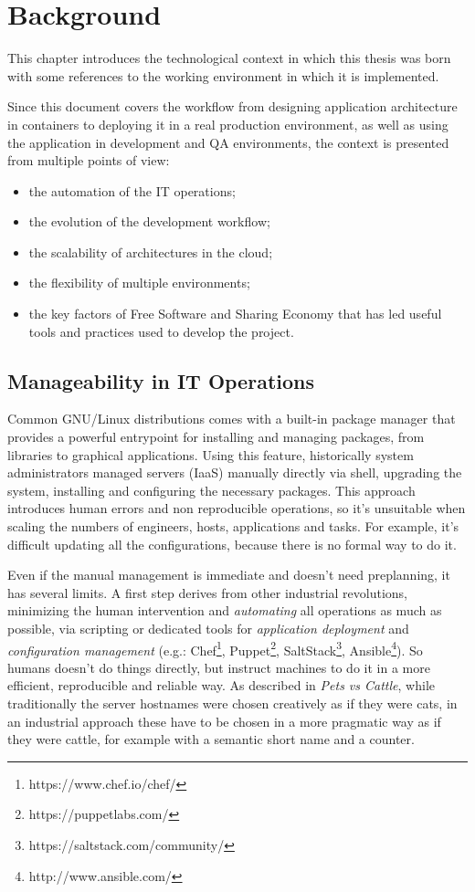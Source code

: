 \chapter{Background}\label{background}

This chapter introduces the technological context in which this thesis was born with some references to the working environment in which it is implemented.

Since this document covers the workflow from designing application architecture in containers to deploying it in a real production environment, as well as using the application in development and QA environments, the context is presented from multiple points of view:

\begin{itemize}
\item the automation of the IT operations;
\item the evolution of the development workflow;
\item the scalability of architectures in the cloud;
\item the flexibility of multiple environments;
\item the key factors of Free Software and Sharing Economy that has led useful tools and practices used to develop the project.
\end{itemize}

\section{Manageability in IT
Operations}\label{manageability-in-it-operations}

Common GNU/Linux distributions comes with a built-in package manager
that provides a powerful entrypoint for installing and managing
packages, from libraries to graphical applications. Using this feature,
historically system administrators managed servers (IaaS)
manually directly via shell, upgrading the system, installing and
configuring the necessary packages. This approach introduces human
errors and non reproducible operations, so it's unsuitable when scaling
the numbers of engineers, hosts, applications and tasks. For example,
it's difficult updating all the configurations, because there is no formal way to do it.

Even if the manual management is immediate and doesn't need
preplanning, it has several limits. A first step derives from
other industrial revolutions, minimizing the human intervention and
\textit{automating} all operations as much as possible, via scripting or
dedicated tools for \textit{application deployment} and
\textit{configuration management} (e.g.: Chef\footnote{https://www.chef.io/chef/}, Puppet\footnote{https://puppetlabs.com/}, SaltStack\footnote{https://saltstack.com/community/},
Ansible\footnote{http://www.ansible.com/}). So humans doesn't do things directly, but instruct machines to
do it in a more efficient, reproducible and reliable way.  As described in \textit{Pets vs Cattle}\cite{PetsVsCattle}, while traditionally the server hostnames were chosen creatively as if they were cats, in an industrial approach these have to be chosen in a more pragmatic way as if they were cattle, for example with a semantic short name and a counter.

